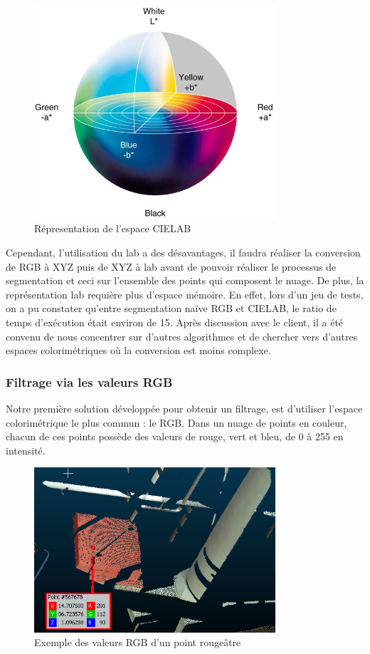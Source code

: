 \documentclass[12pt,titlepage,french]{article}
\begin{document}
\begin{figure}[H]
\center
\includegraphics[width=0.8\textwidth]{./img/CIELAB.png}
    \caption{\label{} Répresentation de l'espace CIELAB}
\end{figure}

Cependant, l'utilisation du lab a des désavantages, il faudra réaliser la conversion de RGB à XYZ puis de XYZ à lab avant de pouvoir réaliser le processus de segmentation et ceci sur l'ensemble des points qui composent le nuage.
De plus, la représentation lab requière plus d'espace mémoire. En effet, lors d'un jeu de tests, on a pu constater qu'entre segmentation naïve RGB et CIELAB, le ratio de temps d'exécution était environ de 15.
Après discussion avec le client, il a été convenu de nous concentrer sur d'autres algorithmes et de chercher vers d'autres espaces colorimétriques où la conversion est moins complexe.


\subsubsection{Filtrage via les valeurs RGB}

Notre première solution développée pour obtenir un filtrage, est d'utiliser l'espace colorimétrique le plus commun : le RGB. Dans un nuage de points en couleur, chacun de ces points possède des valeurs de rouge, vert et bleu, de 0 à 255 en intensité.

\begin{figure}[H]
\center
\includegraphics[width=0.8\textwidth]{./img/exemple_rgb.PNG}
    \caption{\label{} Exemple des valeurs RGB d'un point rougeâtre}
\end{figure}
\end{document}
